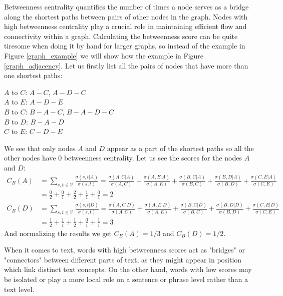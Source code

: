 \documentclass[12pt]{article}
\numberwithin{equation}{section}
\begin{document}
\begin{spacing}{1.5}
	Betweenness centrality quantifies the number of times a node serves as a bridge along the shortest paths between pairs of other nodes in the graph. Nodes with high betweenness centrality play a crucial role in maintaining efficient flow and connectivity within a graph. Calculating the betweenness score can be quite tiresome when doing it by hand for larger graphs, so instead of the example in Figure \ref{graph_example} we will show how the example in Figure \ref{graph_adjacency}. Let us firstly list all the pairs of nodes that have more than one shortest paths:
	\begin{flushleft}
		$A$ to $C$: $A - C$, $A - D - C$ \\
		$A$ to $E$: $A - D - E$ \\
		$B$ to $C$: $B - A - C$, $B - A - D - C$ \\
		$B$ to $D$: $B - A - D$ \\
		$C$ to $E$: $C - D - E$ \\
	\end{flushleft}
	We see that only nodes $A$ and $D$ appear as a part of the shortest paths so all the other nodes have $0$ betweenness centrality. Let us see the scores for the nodes $A$ and $D$:
	\begin{equation*}
		\begin{split}
			C_B(A) & = \sum_{s,t \in \mathcal{V}} \frac{\sigma(s, t|A)}{\sigma(s,t)} = \frac{\sigma(A, C|A)}{\sigma(A, C)} + \frac{\sigma(A, E|A)}{\sigma(A, E)} + \frac{\sigma(B, C|A)}{\sigma(B, C)} + \frac{\sigma(B, D|A)}{\sigma(B, D)} + \frac{\sigma(C, E|A)}{\sigma(C, E)} \\
			& = \frac{0}{2} + \frac{0}{1} + \frac{2}{2} + \frac{1}{1} + \frac{0}{1} = 2 \\
			C_B(D) & = \sum_{s,t \in \mathcal{V}} \frac{\sigma(s, t|D)}{\sigma(s,t)} = \frac{\sigma(A, C|D)}{\sigma(A, C)} + \frac{\sigma(A, E|D)}{\sigma(A, E)} + \frac{\sigma(B, C|D)}{\sigma(B, C)} + \frac{\sigma(B, D|D)}{\sigma(B, D)} + \frac{\sigma(C, E|D)}{\sigma(C, E)} \\
			& = \frac{1}{2} + \frac{1}{1} + \frac{1}{2} + \frac{0}{1} + \frac{1}{1} = 3
		\end{split}
	\end{equation*}
	And normalizing the results we get $C_B(A) = 1/3$ and $C_B(D) = 1/2$.
	
	When it comes to text, words with high betweenness scores act as "bridges" or "connectors" between different parts of text, as they might appear in position which link distinct text concepts. On the other hand, words with low scores may be isolated or play a more local role on a sentence or phrase level rather than a text level.
	

\end{spacing}
\end{document}
